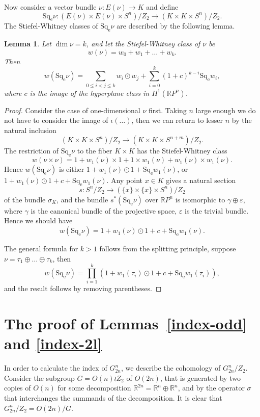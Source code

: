 \documentclass[12pt,a4paper]{amsart}
\newtheorem{lem}{Lemma}
\theoremstyle{definition}
\theoremstyle{remark}
\begin{document}
Now consider a vector bundle $\nu : E(\nu)\to K$ and define 
$$
\operatorname{Sq_e}\nu : (E(\nu)\times E(\nu)\times S^n)/Z_2\to (K\times K\times S^n)/Z_2.
$$
The Stiefel-Whitney classes of $\operatorname{Sq_e}\nu$ are described by the following lemma.

\begin{lem}
\label{sw-sq}
Let $\dim \nu = k$, and let the Stiefel-Whitney class of $\nu$ be 
$$
w(\nu) = w_0+w_1+\ldots + w_k.
$$
Then
$$
w(\operatorname{Sq_e}\nu) = \sum_{0\le i < j \le k} w_i\odot w_j + \sum_{i=0}^k (1+c)^{k-i} \operatorname{Sq_e} w_i,
$$
where $c$ is the image of the hyperplane class in $H^1(\mathbb RP^n)$.
\end{lem}

\begin{proof}
Consider the case of one-dimensional $\nu$ first. Taking $n$ large enough we do not have to consider the image of $\iota(\ldots)$, then we can return to lesser $n$ by the natural inclusion 
$$
(K\times K\times S^n)/Z_2\to (K\times K\times S^{n+m})/Z_2. 
$$
The restriction of $\operatorname{Sq_e}\nu$ to the fiber $K\times K$ has the Stiefel-Whitney class
$$
w(\nu\times\nu) = 1 + w_1(\nu)\times 1 + 1\times w_1(\nu) + w_1(\nu)\times w_1(\nu).
$$
Hence $w(\operatorname{Sq_e}\nu)$ is either $1 + w_1(\nu)\odot 1 + \operatorname{Sq_e} w_1(\nu)$, or $1 + w_1(\nu)\odot 1 + c + \operatorname{Sq_e} w_1(\nu)$. Any point $x\in K$ gives a natural section
$$
s : S^n/Z_2\to (\{x\}\times\{x\}\times S^n)/Z_2
$$
of the bundle $\sigma_K$, and the bundle $s^*(\operatorname{Sq_e}\nu)$ over $\mathbb RP^n$ is isomorphic to $\gamma\oplus{\varepsilon}$, where $\gamma$ is the canonical bundle of the projective space, ${\varepsilon}$ is the trivial bundle. Hence we should have 
$$
w(\operatorname{Sq_e}\nu) = 1 + w_1(\nu)\odot 1 + c + \operatorname{Sq_e} w_1(\nu).
$$

The general formula for $k>1$ follows from the splitting principle, suppose $\nu=\tau_1\oplus\dots\oplus\tau_k$, then
$$
w(\operatorname{Sq_e}\nu) = \prod_{i=1}^k (1 + w_1(\tau_i)\odot 1 + c + \operatorname{Sq_e} w_1(\tau_i)),
$$
and the result follows by removing parentheses.
\end{proof}

\section{The proof of Lemmas~\ref{index-odd} and \ref{index-2l}}

In order to calculate the index of $G_{2n}^n$, we describe the cohomology of $G_{2n}^n/Z_2$. Consider the subgroup $G=O(n)\wr Z_2$ of $O(2n)$, that is generated by two copies of $O(n)$ for some decomposition $\mathbb R^{2n}=\mathbb R^n\oplus\mathbb R^n$, and by the operator $\sigma$ that interchanges the summands of the decomposition. It is clear that $G_{2n}^n/Z_2 = O(2n)/G$.
\end{document}

